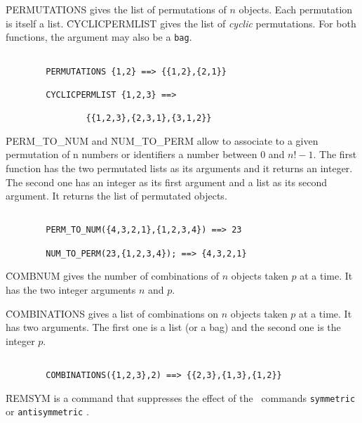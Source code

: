 \f{PERMUTATIONS} gives the list of permutations of $n$ objects.
Each permutation is itself a list. \f{CYCLICPERMLIST} gives the list of
{\em cyclic} permutations. For both functions, the argument may
also be a {\tt bag}.
\begin{verbatim}

        PERMUTATIONS {1,2} ==> {{1,2},{2,1}}

        CYCLICPERMLIST {1,2,3} ==>

                {{1,2,3},{2,3,1},{3,1,2}}

\end{verbatim}
\f{PERM\_TO\_NUM} and \f{NUM\_TO\_PERM} allow to associate to a given 
permutation of n numbers or identifiers a number between $0$ and 
$n! - 1$. The first function has the two permutated lists  
as its arguments and it returns an integer. The second one has an integer  
as its first argument and a list as its second argument. It returns the 
list of permutated objects.
\begin{verbatim}

        PERM_TO_NUM({4,3,2,1},{1,2,3,4}) ==> 23

        NUM_TO_PERM(23,{1,2,3,4}); ==> {4,3,2,1}

\end{verbatim}
\f{COMBNUM} gives the number of combinations of $n$ objects
taken $p$ at a time. It has the two integer arguments $n$ and $p$.

\f{COMBINATIONS} gives a list of combinations on $n$ objects taken $p$
at a time. It has two arguments. The first one is a list (or a bag) and
the second one is the integer $p$.
\begin{verbatim}

        COMBINATIONS({1,2,3},2) ==> {{2,3},{1,3},{1,2}}

\end{verbatim}
\f{REMSYM} is a command that suppresses the effect of the \REDUCE\ commands
\verb+symmetric+ or \verb+antisymmetric+ .

